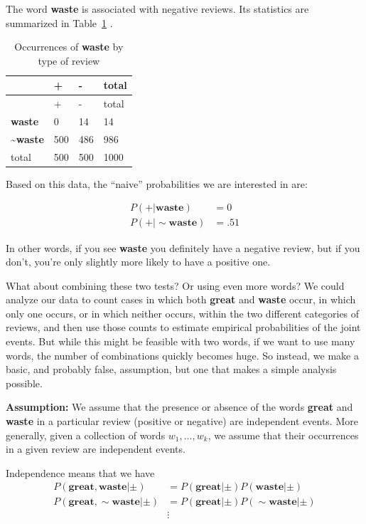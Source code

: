 \documentclass[
  11pt,
  letterpaper,
]{scrbook}
\theoremstyle{plain}
\theoremstyle{remark}
\begin{document}
The word \textbf{waste} is associated with negative reviews. Its
statistics are summarized in Table~\ref{tbl-waste} .

\hypertarget{tbl-waste}{}
\begin{longtable}[]{@{}llll@{}}
\caption{\label{tbl-waste}Occurrences of \textbf{waste} by type of
review}\tabularnewline
\toprule\noalign{}
& + & - & total \\
\midrule\noalign{}
\endfirsthead
\toprule\noalign{}
& + & - & total \\
\midrule\noalign{}
\endhead
\bottomrule\noalign{}
\endlastfoot
\textbf{waste} & 0 & 14 & 14 \\
\textasciitilde{}\textbf{waste} & 500 & 486 & 986 \\
total & 500 & 500 & 1000 \\
\end{longtable}

Based on this data, the ``naive'' probabilities we are interested in
are:

\begin{align*}
P(+|\mathbf{waste}) &= 0\\
P(+|\sim\mathbf{waste}) &= .51
\end{align*}

In other words, if you see \textbf{waste} you definitely have a negative
review, but if you don't, you're only slightly more likely to have a
positive one.

What about combining these two tests? Or using even more words? We could
analyze our data to count cases in which both \textbf{great} and
\textbf{waste} occur, in which only one occurs, or in which neither
occurs, within the two different categories of reviews, and then use
those counts to estimate empirical probabilities of the joint events.
But while this might be feasible with two words, if we want to use many
words, the number of combinations quickly becomes huge. So instead, we
make a basic, and probably false, assumption, but one that makes a
simple analysis possible.

\textbf{Assumption:} We assume that the presence or absence of the words
\textbf{great} and \textbf{waste} in a particular review (positive or
negative) are independent events. More generally, given a collection of
words \(w_1,\ldots, w_k\), we assume that their occurrences in a given
review are independent events.

Independence means that we have \begin{align*}
P(\mathbf{great},\mathbf{waste}|\pm) &= P(\mathbf{great}|\pm)P(\mathbf{waste}|\pm)\\
P(\mathbf{great},\sim\mathbf{waste}|\pm) &= P(\mathbf{great}|\pm)P(\sim\mathbf{waste}|\pm)\\
 &\vdots \\
\end{align*}
\end{document}

